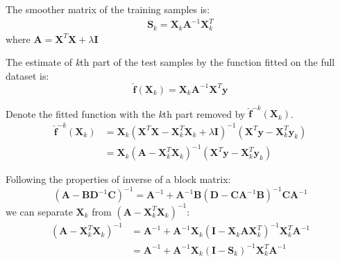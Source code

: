 \documentclass[a4paper,11pt]{article}
\begin{document}
The smoother matrix of the training samples is:
\begin{align}
\mathbf{S}_k = \mathbf{X}_k \mathbf{A}^{-1} \mathbf{X}_{k}^T
\end{align}
where $\mathbf{A} = \mathbf{X}^T \mathbf{X} + \lambda \mathbf{I}$

The estimate of \textit{k}th part of the test samples by the function fitted on the full dataset is:
\begin{equation}
\hat{\mathbf{f}}(\mathbf{X}_k) = \mathbf{X}_k \mathbf{A}^{-1} \mathbf{X}^T \mathbf{y}
\end{equation}

Denote the fitted function with the \textit{k}th part removed by $\hat{\mathbf{f}}^{-k} (\mathbf{X}_k)$.
\begin{align}
\hat{\mathbf{f}}^{-k} (\mathbf{X}_k) & = \mathbf{X}_k (\mathbf{X}^T\mathbf{X} 
		- \mathbf{X}_k^T \mathbf{X}_k 
		+ \lambda \mathbf{I})^{-1}(\mathbf{X}^T \mathbf{y} - \mathbf{X}_k^T \mathbf{y}_k) \\
	& = \mathbf{X}_k (\mathbf{A} - \mathbf{X}_k^T \mathbf{X}_k)^{-1} 
		(\mathbf{X}^T \mathbf{y} - \mathbf{X}_k^T \mathbf{y}_k)
\end{align}

Following the properties of inverse of a block matrix:
\begin{equation}
(\mathbf{A} - \mathbf{B}\mathbf{D}^{-1}\mathbf{C})^{-1} = \mathbf{A}^{-1}
	+ \mathbf{A}^{-1}\mathbf{B}(\mathbf{D} - \mathbf{C}\mathbf{A}^{-1}\mathbf{B})^{-1}\mathbf{C}\mathbf{A}^{-1}
\end{equation}
we can separate $\mathbf{X}_k$ from $(\mathbf{A} - \mathbf{X}_k^T \mathbf{X}_k)^{-1}$:
\begin{align}
(\mathbf{A} - \mathbf{X}_k^T \mathbf{X}_k)^{-1} & = \mathbf{A}^{-1} 
	+ \mathbf{A}^{-1}\mathbf{X}_k (\mathbf{I} - \mathbf{X}_k \mathbf{A} \mathbf{X}_k^T)^{-1} \mathbf{X}_k^T \mathbf{A}^{-1} \\
	& = \mathbf{A}^{-1}  + \mathbf{A}^{-1}\mathbf{X}_k (\mathbf{I} - \mathbf{S}_k)^{-1} \mathbf{X}_k^T \mathbf{A}^{-1}
\end{align}
\end{document}
